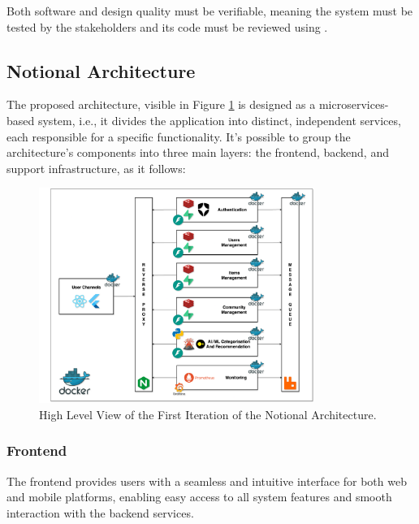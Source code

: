 Both software and design quality must be verifiable, meaning the system must be tested by the stakeholders and its code must be reviewed using .


\subsection{Notional Architecture} \label{section:notional_architecture}

The proposed architecture, visible in Figure \ref{fig:notional_arch} is designed as a microservices-based system, i.e., it divides the application into distinct, independent services, each responsible for a specific functionality. It's possible to group the architecture's components into three main layers: the frontend, backend, and support infrastructure, as it follows:

\begin{figure}[!htb]
    \includegraphics[width=0.8\textwidth]{figs/chapter3/notional_arch.png}
    \centering
    \caption[Notional Architecture]{High Level View of the First Iteration of the Notional Architecture.}
    \label{fig:notional_arch}
\end{figure}

\subsubsection{Frontend}

The frontend provides users with a seamless and intuitive interface for both web and mobile platforms, enabling easy access to all system features and smooth interaction with the backend services.

